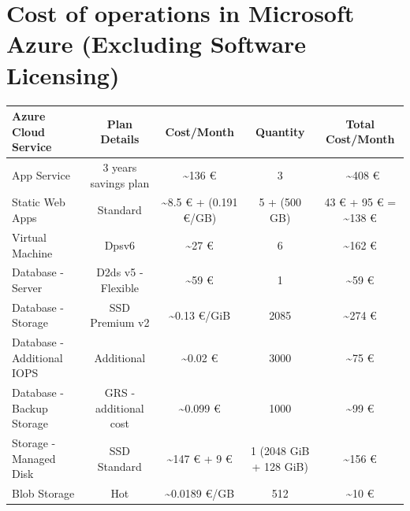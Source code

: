 \documentclass{llncs}
\begin{document}
\section{Cost of operations in Microsoft Azure (Excluding Software Licensing) \cite{azurepricingcalculator}}
\begin{table}[htbp]
    \centering
    \begin{tabular}{|l|c|c|c|c|}
        \hline
        \textbf{Azure Cloud Service} & \textbf{Plan Details} & \textbf{Cost/Month}                  & \textbf{Quantity}      & \textbf{Total Cost/Month}           \\

        \hline
        App Service                  & 3 years savings plan  & \textasciitilde 136 €                & 3                      & ~\textasciitilde 408 €              \\
        \hline
        Static Web Apps              & Standard              & \textasciitilde 8.5 € + (0.191 €/GB) & 5 + (500 GB)           & 43 € + 95 € = \textasciitilde 138 € \\
        \hline
        Virtual Machine              & Dpsv6                 & \textasciitilde 27 €                 & 6                      & \textasciitilde 162 €               \\
        \hline
        Database - Server            & D2ds v5 - Flexible    & \textasciitilde 59 €                 & 1                      & \textasciitilde 59 €                \\
        \hline
        Database - Storage           & SSD Premium v2        & \textasciitilde 0.13 €/GiB           & 2085                   & \textasciitilde 274 €               \\
        \hline
        Database - Additional IOPS   & Additional            & \textasciitilde 0.02 €               & 3000                   & \textasciitilde 75 €                \\
        \hline
        Database - Backup Storage    & GRS - additional cost & \textasciitilde 0.099 €              & 1000                   & \textasciitilde 99 €                \\
        \hline
        Storage - Managed Disk       & SSD Standard          & \textasciitilde 147 € + 9 €          & 1 (2048 GiB + 128 GiB) & \textasciitilde 156 €               \\
        \hline
        Blob Storage                 & Hot                   & \textasciitilde 0.0189 €/GB          & 512                    & \textasciitilde 10 €                \\

\end{tabular}
\end{table}
\end{document}
